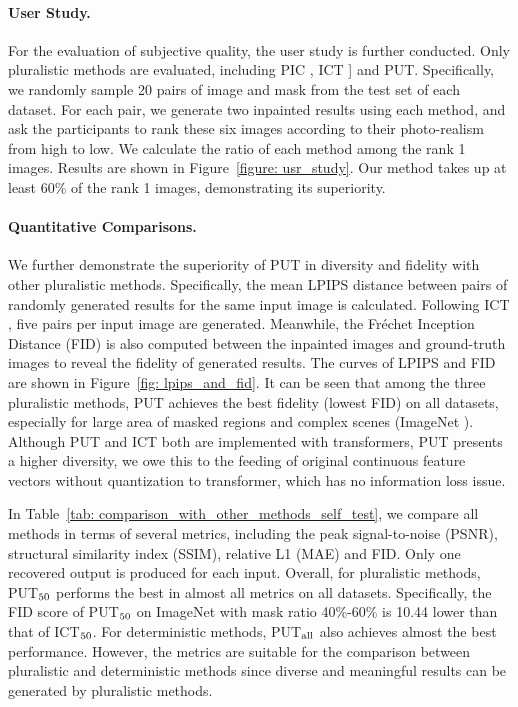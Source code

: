 \documentclass[10pt,twocolumn,letterpaper]{article}
\newcommand{\Tref}[1]{Table~\ref{#1}}
\newcommand{\Fref}[1]{Figure~\ref{#1}}
\begin{document}
\paragraph{User Study.} For the evaluation of subjective quality, the user study is further conducted. Only pluralistic methods are evaluated, including PIC \cite{zheng2019pluralistic}, ICT \cite{wan2021high}] and PUT. Specifically, we randomly sample 20 pairs of image and mask from the test set of each dataset. For each pair, we generate two inpainted results using each method, and ask the participants to rank these six images according to their photo-realism from high to low. 
We calculate the ratio of each method among the rank 1 images.
Results are shown in \Fref{figure: usr_study}. Our method takes up at least 60\% of the rank 1 images, demonstrating its superiority.


\paragraph{Quantitative Comparisons.} We further demonstrate the superiority of PUT in diversity and fidelity with other pluralistic methods. Specifically, the mean LPIPS distance \cite{zhang2018unreasonable}  between pairs of randomly generated results for the same input image is calculated. Following ICT \cite{wan2021high}, five pairs per input image are generated. Meanwhile, the Fréchet Inception Distance (FID) \cite{heusel2017gans} is also computed between the inpainted images and ground-truth images to reveal the fidelity of generated results. The curves of LPIPS and FID are shown in \Fref{fig: lpips_and_fid}. It can be seen that among the three pluralistic methods, PUT achieves the best fidelity (lowest FID) on all datasets, especially for large area of masked regions and complex scenes (ImageNet \cite{deng2009imagenet}). Although PUT and ICT both are implemented with transformers, 
PUT presents a higher diversity, we owe this to the feeding of original continuous feature vectors without quantization to transformer,
which has no information loss issue.

In \Tref{tab: comparison_with_other_methods_self_test}, we compare all methods in terms of several metrics, including the peak signal-to-noise (PSNR), structural similarity index (SSIM), relative L1 (MAE) and FID. 
Only one recovered output is produced for each input. Overall, for pluralistic methods, PUT$_{\rm{50}}$ performs the best in almost all metrics on all datasets. Specifically, the FID score of PUT$_{\rm 50}$ on ImageNet with mask ratio 40\%-60\% is 10.44 lower than that of ICT$_{\rm 50}$. For deterministic methods, PUT$_{\rm all}$ also achieves almost the best performance. However, the metrics are suitable for the comparison between pluralistic and deterministic methods since diverse and meaningful results can be generated by pluralistic methods.
\end{document}
